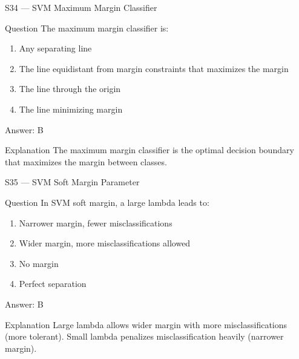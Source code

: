 \documentclass[aspectratio=169,8pt]{beamer}
\begin{document}
	\begin{frame}{S34 --- SVM Maximum Margin Classifier}
		\begin{block}{Question}
			The maximum margin classifier is:
			\begin{enumerate}
				\item Any separating line
				\item The line equidistant from margin constraints that maximizes the margin
				\item The line through the origin
				\item The line minimizing margin
			\end{enumerate}
		\end{block}
		\begin{exampleblock}{Answer: B}\end{exampleblock}
		\begin{block}{Explanation}
			The maximum margin classifier is the optimal decision boundary that maximizes the margin between classes.
		\end{block}
	\end{frame}
	
	\begin{frame}{S35 --- SVM Soft Margin Parameter}
		\begin{block}{Question}
			In SVM soft margin, a large lambda leads to:
			\begin{enumerate}
				\item Narrower margin, fewer misclassifications
				\item Wider margin, more misclassifications allowed
				\item No margin
				\item Perfect separation
			\end{enumerate}
		\end{block}
		\begin{exampleblock}{Answer: B}\end{exampleblock}
		\begin{block}{Explanation}
			Large lambda allows wider margin with more misclassifications (more tolerant). Small lambda penalizes misclassification heavily (narrower margin).
		\end{block}
	\end{frame}
	
\end{document}
